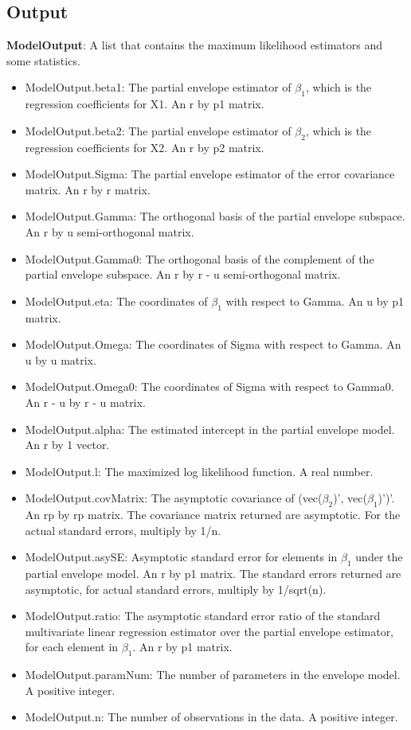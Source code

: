 \documentclass[a4paper,11pt,openany]{memoir}
\begin{document}
\subsection*{Output}

\begin{par}
\textbf{ModelOutput}: A list that contains the maximum likelihood estimators and some statistics.
\end{par} \vspace{1em}
\begin{itemize}
\setlength{\itemsep}{-1ex}
   \item ModelOutput.beta1: The partial envelope estimator of $\beta_1$, which is the regression coefficients for X1. An r by p1 matrix.
   \item ModelOutput.beta2: The partial envelope estimator of $\beta_2$, which is the regression coefficients for X2. An r by p2 matrix.
   \item ModelOutput.Sigma: The partial envelope estimator of the error covariance matrix.  An r by r matrix.
   \item ModelOutput.Gamma: The orthogonal basis of the partial envelope subspace. An r by u semi-orthogonal matrix.
   \item ModelOutput.Gamma0: The orthogonal basis of the complement of the partial envelope subspace.  An r by r - u semi-orthogonal matrix.
   \item ModelOutput.eta: The coordinates of $\beta_1$ with respect to Gamma. An u by p1 matrix.
   \item ModelOutput.Omega: The coordinates of Sigma with respect to Gamma. An u by u matrix.
   \item ModelOutput.Omega0: The coordinates of Sigma with respect to Gamma0. An r - u by r - u matrix.
   \item ModelOutput.alpha: The estimated intercept in the partial envelope model.  An r by 1 vector.
   \item ModelOutput.l: The maximized log likelihood function.  A real number.
   \item ModelOutput.covMatrix: The asymptotic covariance of (vec($\beta_2$)', vec($\beta_1$)')'.  An rp by rp matrix.  The covariance matrix returned are asymptotic.  For the actual standard errors, multiply by 1/n.
   \item ModelOutput.asySE: Asymptotic standard error for elements in $\beta_1$ under the partial envelope model.  An r by p1 matrix.  The standard errors returned are asymptotic, for actual standard errors, multiply by 1/sqrt(n).
   \item ModelOutput.ratio: The asymptotic standard error ratio of the standard multivariate linear regression estimator over the partial envelope estimator, for each element in $\beta_1$.  An r by p1 matrix.
   \item ModelOutput.paramNum: The number of parameters in the envelope model.  A positive integer.
   \item ModelOutput.n: The number of observations in the data.  A positive integer.
\end{itemize}
\end{document}
